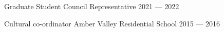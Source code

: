 Graduate Student Council Representative	\hfill 2021 --- 2022
 
Cultural co-ordinator Amber Valley Residential School	\hfill  2015 --- 2016

